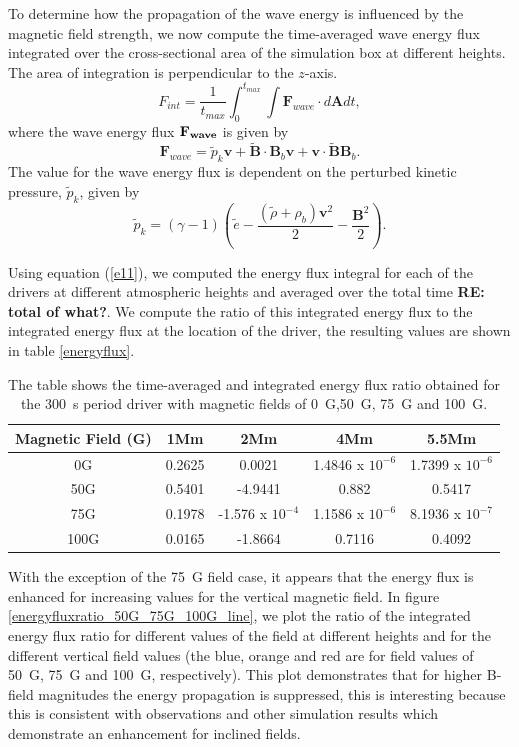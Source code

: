 \documentclass{aastex62}
\begin{document}
To determine how the propagation of the wave energy is influenced by the magnetic field strength, we now compute the time-averaged wave energy flux integrated over the cross-sectional area of the simulation box at different heights. The area of integration is perpendicular to the $z$-axis.
\begin{equation}
F_{int}= \frac{1}{t_{max}} \int_{0}^{t_{max}} \int {\mathbf F}_{wave} \cdot d{\mathbf A}dt,
\label{e11}
\end{equation}
where the wave energy flux $\bf{F}_{wave}$ is given by
$$
{\mathbf F}_{wave}=\tilde{p}_{k} {\mathbf v}+\tilde{\mathbf B}\cdot {\mathbf B_{b}}{\mathbf v}+{\mathbf v}\cdot \tilde{\mathbf B}{\mathbf B_{b}} .
$$
The value for the wave energy flux is dependent on the perturbed kinetic pressure, $\tilde{p}_{k}$, given by \citet{Bogdan2003}
$$
\tilde{p}_{k}=\left(\gamma - 1\right)\left( \tilde{e}-\frac{ \left( \tilde{\rho} +\rho_b \right){\mathbf v}^2}{2}-\frac{{\mathbf B}^2}{2}\right).
$$


Using equation (\ref{e11}), we computed the energy flux integral for each of the drivers at different atmospheric heights and averaged over the total time {\bf RE: total of what?}. We compute the ratio of this integrated energy flux to the integrated energy flux at the location of the driver, the resulting values are shown in table \ref{energyflux}.

\begin{table}\label{energyflux}
\centering
\begin{tabular}{c c c c c}
\hline
Magnetic Field (G)   &  1Mm  &  2Mm &  4Mm & 5.5Mm \\
\hline
0G & 0.2625  &    0.0021      &   1.4846 x $10^{-6}$     &   1.7399 x $10^{-6}$      \\
\hline
50G & 0.5401  &   -4.9441       &   0.882      &  0.5417     \\
\hline
75G & 0.1978  &    -1.576 x $10^{-4}$      &   1.1586 x $10^{-6}$     &   8.1936 x $10^{-7}$      \\
\hline
100G & 0.0165  &   -1.8664      &   0.7116      &   0.4092    \\
\hline

\end{tabular} 
\caption{The table shows the time-averaged and integrated energy flux ratio obtained  for the 300~s period driver with magnetic fields of 0~G,50~G, 75~G and 100~G.}
\label{energyfluxratio}
\end{table}

With the exception of the 75~G field case, it appears that the energy flux is enhanced for increasing values for the vertical magnetic field. In figure \ref{energyfluxratio_50G_75G_100G_line}, we plot the ratio of the integrated energy flux ratio for different values of the field at different heights and for the different vertical field values (the blue, orange and red are for field values of 50~G, 75~G and 100~G, respectively). This plot demonstrates that for higher B-field magnitudes the energy propagation is suppressed, this is interesting because this is consistent with observations and other simulation results which demonstrate an enhancement for inclined fields.
\end{document}
